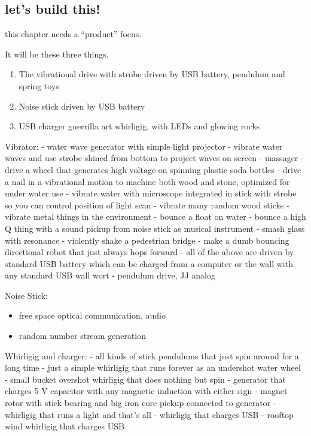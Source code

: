 \subsection{let's build this!}\label{lets-build-this}

this chapter needs a ``product'' focus.

It will be these three things.

\begin{enumerate}
\def\labelenumi{\arabic{enumi}.}
\tightlist
\item
  The vibrational drive with strobe driven by USB battery, pendulum and
  spring toys
\item
  Noise stick driven by USB battery
\item
  USB charger guerrilla art whirligig, with LEDs and glowing rocks
\end{enumerate}

Vibrator: - water wave generator with simple light projector - vibrate
water waves and use strobe shined from bottom to project waves on screen
- massager - drive a wheel that generates high voltage on spinning
plastic soda bottles - drive a nail in a vibrational motion to machine
both wood and stone, optimized for under water use - vibrate water with
microscope integrated in stick with strobe so you can control position
of light scan - vibrate many random wood sticks - vibrate metal things
in the environment - bounce a float on water - bounce a high Q thing
with a sound pickup from noise stick as musical instrument - smash glass
with resonance - violently shake a pedestrian bridge - make a dumb
bouncing directional robot that just always hops forward - all of the
above are driven by standard USB battery which can be charged from a
computer or the wall with any standard USB wall wort - pendulum drive,
JJ analog

Noise Stick:

\begin{itemize}
\tightlist
\item
  free space optical communication, audio
\item
  random number stream generation
\end{itemize}

Whirligig and charger: - all kinds of stick pendulums that just spin
around for a long time - just a simple whirligig that runs forever as an
undershot water wheel - small bucket overshot whirligig that does
nothing but spin - generator that charges 5 V capacitor with any
magnetic induction with either sign - magnet rotor with stick bearing
and big iron core pickup connected to generator - whirligig that runs a
light and that's all - whirligig that charges USB - rooftop wind
whirligig that charges USB

